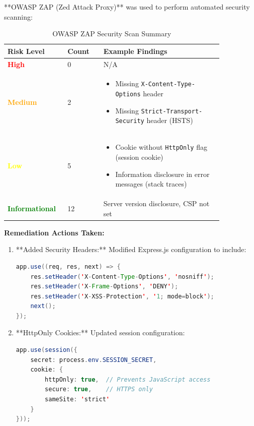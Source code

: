 \documentclass[12pt, a4paper]{report}
\begin{document}
**OWASP ZAP (Zed Attack Proxy)** was used to perform automated security scanning:

\begin{table}[H]
\centering
\caption{OWASP ZAP Security Scan Summary}
\label{tab:zap_scan}
\begin{tabular}{@{}p{0.20\linewidth}p{0.15\linewidth}p{0.50\linewidth}@{}}
\toprule
\textbf{Risk Level} & \textbf{Count} & \textbf{Example Findings} \\
\midrule
\textcolor{red}{\textbf{High}} & 0 & N/A \\
\textcolor{orange}{\textbf{Medium}} & 2 & 
\begin{minipage}[t]{\linewidth}
\begin{itemize}[nosep,leftmargin=*]
    \item Missing \texttt{X-Content-Type-Options} header
    \item Missing \texttt{Strict-Transport-Security} header (HSTS)
\end{itemize}
\end{minipage} \\
\textcolor{yellow}{\textbf{Low}} & 5 & 
\begin{minipage}[t]{\linewidth}
\begin{itemize}[nosep,leftmargin=*]
    \item Cookie without \texttt{HttpOnly} flag (session cookie)
    \item Information disclosure in error messages (stack traces)
\end{itemize}
\end{minipage} \\
\textcolor{green}{\textbf{Informational}} & 12 & Server version disclosure, CSP not set \\
\bottomrule
\end{tabular}
\end{table}

\textbf{Remediation Actions Taken:}

\begin{enumerate}
    \item **Added Security Headers:** Modified Express.js configuration to include:
    \begin{lstlisting}[language=Java]
app.use((req, res, next) => {
    res.setHeader('X-Content-Type-Options', 'nosniff');
    res.setHeader('X-Frame-Options', 'DENY');
    res.setHeader('X-XSS-Protection', '1; mode=block');
    next();
});
    \end{lstlisting}
    
    \item **HttpOnly Cookies:** Updated session configuration:
    \begin{lstlisting}[language=Java]
app.use(session({
    secret: process.env.SESSION_SECRET,
    cookie: { 
        httpOnly: true,  // Prevents JavaScript access
        secure: true,    // HTTPS only
        sameSite: 'strict' 
    }
}));
    \end{lstlisting}
\end{enumerate}
\end{document}
